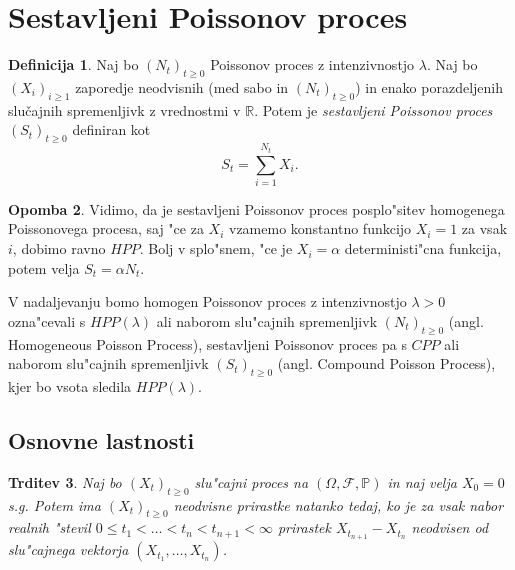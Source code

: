 \documentclass[12pt, a4paper, reqno]{amsart}
\theoremstyle{definition}
\newtheorem{definicija}{Definicija}[section]
\newtheorem{opomba}[definicija]{Opomba}
\theoremstyle{plain}
\newtheorem{trditev}[definicija]{Trditev}
\newcommand{\F}{\mathcal{F}}
\newcommand{\1}{\mathds{1}}
\begin{document}
\pagebreak
\section{Sestavljeni Poissonov proces}

    \begin{center}
    \end{center}
    \begin{definicija}
        Naj bo $(N_t)_{t\geq0}$ Poissonov proces z intenzivnostjo $\lambda$. 
        Naj bo $(X_i)_{i\geq1}$ zaporedje neodvisnih (med sabo in $(N_t)_{t\geq0}$) in enako 
        porazdeljenih slučajnih spremenljivk z vrednostmi v $\mathbb{R}$. Potem je 
        \textit{sestavljeni Poissonov proces} $(S_t)_{t\geq0}$ definiran kot
        $$
            S_t = \sum_{i=1}^{N_t} X_i.
        $$
        \label{def:CPP}
    \end{definicija}

    \begin{opomba}
        Vidimo, da je sestavljeni Poissonov proces posplo"sitev homogenega Poissonovega procesa, saj "ce za
        $X_i$ vzamemo konstantno funkcijo $X_i = 1$ za vsak $i$, dobimo ravno $HPP$. Bolj v splo"snem, "ce je 
        $X_i = \alpha$ deterministi"cna funkcija, potem velja $S_t = \alpha N_t$.
        \label{op:CPPHPPPovezava}
    \end{opomba}

    V nadaljevanju bomo homogen Poissonov proces z intenzivnostjo $\lambda >0$ ozna"cevali s $HPP(\lambda)$ 
    ali naborom slu"cajnih spremenljivk $(N_t)_{t\geq0}$ (angl. Homogeneous Poisson Process), 
    sestavljeni Poissonov proces pa s $CPP$ ali naborom slu"cajnih spremenljivk $(S_t)_{t\geq0}$ 
    (angl. Compound Poisson Process), kjer bo vsota sledila $HPP(\lambda)$.

    \subsection{Osnovne lastnosti}

        \begin{trditev}
            Naj bo $(X_t)_{t\geq0}$ slu"cajni proces na $(\Omega, \F, \mathbb{P})$ in naj velja $X_0 = 0$ s.g.
            Potem ima $(X_t)_{t\geq0}$
            neodvisne prirastke natanko tedaj, ko je za vsak nabor realnih "stevil 
            $0 \leq t_1 < \ldots < t_n < t_{n+1} <\infty$ prirastek $X_{t_{n+1}} - X_{t_n}$ neodvisen od
            slu"cajnega vektorja $(X_{t_1}, \dots, X_{t_n})$.
            \label{trd:ekvivKarakterizacija}
        \end{trditev}
\end{document}
